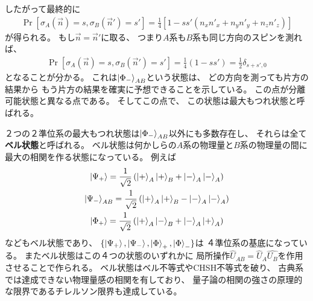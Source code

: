 \documentclass[a4paper, 10pt]{jsarticle}
\begin{document}
したがって最終的に
\begin{align}
	\Pr \left[ \sigma_A (\vec{n}) = s, \sigma_B (\vec{n}') = s' \right]
	= \frac{1}{4}
	\left[ 1 - ss' \left( n_x n'_x + n_y n'_y + n_z n'_z \right) \right]
\end{align}
が得られる。
もし$\vec{n} = \vec{n}'$に取る、
つまり$A$系も$B$系も同じ方向のスピンを測れば、
\begin{align}
	\Pr \left[ \sigma_A (\vec{n}) = s, \sigma_B (\vec{n}') = s' \right]
	= \frac{1}{4} \left( 1 - ss' \right)
	= \frac{1}{2} \delta_{s+s', 0}
\end{align}
となることが分かる。
これは$\Ket{\Phi_-}_{AB}$という状態は、
どの方向を測っても片方の結果から
もう片方の結果を確実に予想できることを示している。
この点が分離可能状態と異なる点である。
そしてこの点で、
この状態は最大もつれ状態と呼ばれる。

２つの２準位系の最大もつれ状態は$\Ket{\Phi_-}_{AB}$以外にも多数存在し、
それらは全て\textbf{ベル状態}と呼ばれる。
ベル状態は何かしらの$A$系の物理量と$B$系の物理量の間に
最大の相関を作る状態になっている。
例えば
\begin{gather}
	\Ket{\Psi_+} = \frac{1}{\sqrt{2}} \left( \Ket{+}_A \Ket{+}_B
	+ \Ket{-}_A \Ket{-}_A \right) \\
	\Ket{\Psi_-}_{AB} = \frac{1}{\sqrt{2}} \left( \Ket{+}_A \Ket{+}_B
	- \Ket{-}_A \Ket{-}_A \right) \\
	\Ket{\Phi_+} = \frac{1}{\sqrt{2}} \left( \Ket{+}_A \Ket{-}_B
	+ \Ket{-}_A \Ket{+}_A \right)
\end{gather}
などもベル状態であり、
$\{ \Ket{\Psi_+}, \Ket{\Psi_-}, \Ket{\Phi}_+, \Ket{\Phi}_- \}$は
４準位系の基底になっている。
またベル状態はこの４つの状態のいずれかに
局所操作$\hat{U}_{AB} = \hat{U}_A \hat{U_B}$を作用させることで作られる。
ベル状態はベル不等式やCHSH不等式を破り、
古典系では達成できない物理量感の相関を有しており、
量子論の相関の強さの原理的な限界であるチレルソン限界も達成している。

\appendix
\end{document}
